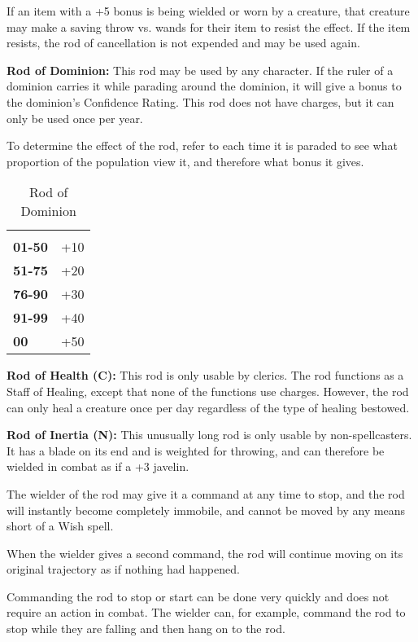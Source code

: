 \begin{multicols*}{2}
If an item with a +5 bonus is being wielded or worn by a creature, that creature may make a saving throw vs. wands for their item to resist the effect. If the item resists, the rod of cancellation is not expended and may be used again.

\textbf{Rod of Dominion:} This rod may be used by any character. If the ruler of a dominion carries it while parading around the dominion, it will give a bonus to the dominion’s Confidence Rating. This rod does not have charges, but it can only be used once per year.

To determine the effect of the rod, refer to  each time it is paraded to see what proportion of the population view it, and therefore what bonus it gives.

\begin {table}[H]
  \caption{Rod of Dominion}\label{tab:Rod of Dominion}
  \begin{tabularx}{\columnwidth}{>{\bfseries}YY}
	 & \\
	01-50 & +10\\
	51-75 & +20\\
	76-90 & +30\\
	91-99 & +40\\
	00 & +50
  \end {tabularx}
\end {table}

\textbf{Rod of Health (C):} This rod is only usable by clerics. The rod functions as a Staff of Healing, except that none of the functions use charges. However, the rod can only heal a creature once per day regardless of the type of healing bestowed.

\textbf{Rod of Inertia (N):} This unusually long rod is only usable by non-spellcasters. It has a blade on its end and is weighted for throwing, and can therefore be wielded in combat as if a +3 javelin.

The wielder of the rod may give it a command at any time to stop, and the rod will instantly become completely immobile, and cannot be moved by any means short of a Wish spell.

When the wielder gives a second command, the rod will continue moving on its original trajectory as if nothing had happened.

Commanding the rod to stop or start can be done very quickly and does not require an action in combat. The wielder can, for example, command the rod to stop while they are falling and then hang on to the rod.


\end{multicols*}
